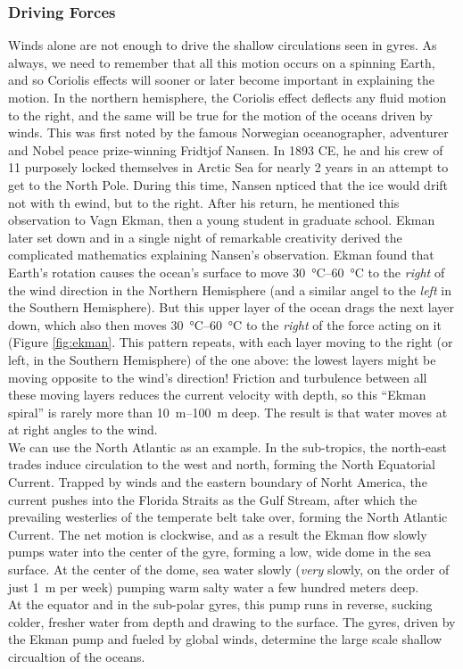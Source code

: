 \documentclass[amstex,12pt]{book}
\begin{document}
{\subsubsection{Driving Forces}
Winds alone are not enough to drive the shallow circulations seen in gyres. As always, we need to remember that all this motion occurs on a spinning Earth, and so Coriolis effects will sooner or later become important in explaining the motion. In the northern hemisphere, the Coriolis effect deflects any fluid motion to the right, and the same will be true for the motion of the oceans driven by winds. This was first noted by the famous Norwegian oceanographer, adventurer and Nobel peace prize-winning Fridtjof Nansen. In 1893 CE, he and his crew of 11 purposely locked themselves in Arctic Sea for nearly 2 years in an attempt to get to the North Pole. During this time, Nansen npticed that the ice would drift not with th ewind, but to the right. After his return, he mentioned this observation to Vagn Ekman, then a young student in graduate school. Ekman later set down and in a single night of remarkable creativity derived the complicated mathematics explaining Nansen's observation. Ekman found that Earth's rotation causes the ocean's surface to move \SIrange{30}{60}{\celsius} to the \emph{right} of the wind direction in the Northern Hemisphere (and a similar angel to the \emph{left} in the Southern Hemisphere). But this upper layer of the ocean drags the next layer down, which also then moves \SIrange{30}{60}{\celsius} to the \emph{right} of the force acting on it (Figure \ref{fig:ekman}. This pattern repeats, with each layer moving to the right (or left, in the Southern Hemisphere) of the one above: the lowest layers might be moving opposite to the wind's direction! Friction and turbulence between all these moving layers reduces the current velocity with depth, so this ``Ekman spiral'' is rarely more than \SIrange{10}{100}{\metre} deep. The result is that water moves at at right angles to the wind.\\
We can use the North Atlantic as an example. In the sub-tropics, the north-east trades induce circulation to the west and north, forming the North Equatorial Current. Trapped by winds and the eastern boundary of Norht America, the current pushes into the Florida Straits as the Gulf Stream, after which the prevailing westerlies of the temperate belt take over, forming the North Atlantic Current. The net motion is clockwise, and as a result the Ekman flow slowly pumps water into the center of the gyre, forming a low, wide dome in the sea surface. At the center of the dome, sea water slowly (\emph{very} slowly, on the order of just \SI{1}{\metre} per week) pumping warm salty water a few hundred meters deep.\\ At the equator and in the sub-polar gyres, this pump runs in reverse, sucking colder, fresher water from depth and drawing to the surface. The gyres, driven by the Ekman pump and fueled by global winds, determine the large scale shallow circualtion of the oceans.
}
\end{document}
